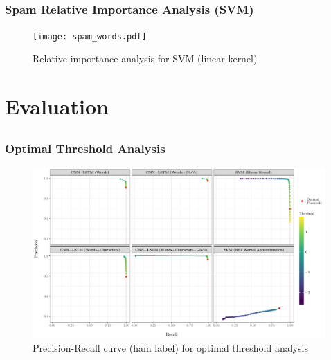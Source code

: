 \documentclass{beamer}
\begin{document}
\subsection{}
\begin{framefont}{\footnotesize}
	\begin{frame}
		\frametitle{Spam Relative Importance Analysis (SVM)}
		\centering
		\begin{figure}
			\captionsetup{justification=centering}
			\texttt{[image: spam\_words.pdf]}
			\caption{Relative importance analysis for SVM (linear kernel)}
		\end{figure}
	\end{frame}
\end{framefont}

\section{Evaluation}
\subsection{}
\begin{framefont}{\footnotesize}
	\begin{frame}
		\frametitle{Optimal Threshold Analysis}
		\centering
		\begin{figure}
			\captionsetup{justification=centering}
			\includegraphics[trim={0cm 0cm 0.2cm 0cm},clip,width=11.2cm]{combined.pdf}
			\caption{Precision-Recall curve (ham label) for optimal threshold analysis}
		\end{figure}
	\end{frame}
\end{framefont}
\end{document}

